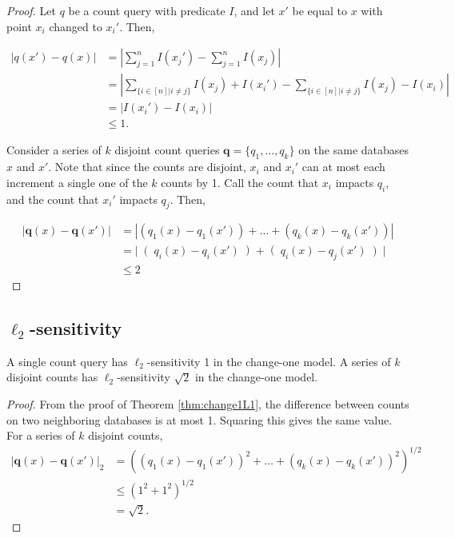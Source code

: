 \documentclass[11pt]{scrartcl} %
\begin{document}
\begin{proof}
Let $q$ be a count query with predicate $I$, and let $x'$ be equal to $x$ with point $x_i$ changed to $x_i'$. Then,

\begin{align*}
\left\vert q(x') - q(x) \right\vert &= \left\vert \sum_{j=1}^n I(x_j') - \sum_{j=1}^n I(x_j) \right\vert \\
	&= \left\vert \sum_{\{ i \in [n] \vert i \ne j\}} I(x_j) + I(x_i') - \sum_{\{ i \in [n] \vert i \ne j\}} I(x_j) - I(x_i) \right\vert \\
	&= \left\vert I(x_i') - I(x_i) \right\vert \\
	& \le 1.
\end{align*}

Consider a series of $k$ disjoint count queries $\mathbf{q} = \{q_1, \ldots, q_k\}$ on the same databases $x$ and $x'$. Note that since the counts are disjoint, $x_i$ and $x_i'$ can at most each increment a single one of the $k$ counts by 1. Call the count that $x_i$ impacts $q_i$, and the count that $x_i'$ impacts $q_j$. Then,

\begin{align*}
\left\vert \mathbf{q}(x) - \mathbf{q}(x') \right\vert &= \left\vert \left(q_1(x) - q_1(x')\right) + \ldots + \left(q_k(x) - q_k(x')\right) \right\vert \\
	&= \left\vert \right(q_i(x) - q_i(x')\left) + \right(q_i(x) - q_j(x')\left) \right\vert \\
	&\le 2
\end{align*}
\end{proof}

\subsection{$\ell_2$-sensitivity}

\begin{theorem}
A single count query has $\ell_2$-sensitivity 1 in the change-one model. A series of $k$ disjoint counts has $\ell_2$-sensitivity $\sqrt{2}$ in the change-one model.
\end{theorem}

\begin{proof}
From the proof of Theorem \ref{thm:change1L1}, the difference between counts on two neighboring databases is at most 1. Squaring this gives the same value. For a series of $k$ disjoint counts,
\begin{align*}
\left\vert \mathbf{q}(x) - \mathbf{q}(x') \right\vert_2 &= \left( \left(q_1(x) - q_1(x')\right)^2 + \ldots + \left(q_k(x) - q_k(x')\right)^2 \right)^{1/2} \\
 & \le \left( 1^2 + 1^2 \right)^{1/2} \\
 &= \sqrt{2}.
 \end{align*}
\end{proof}
\end{document}
